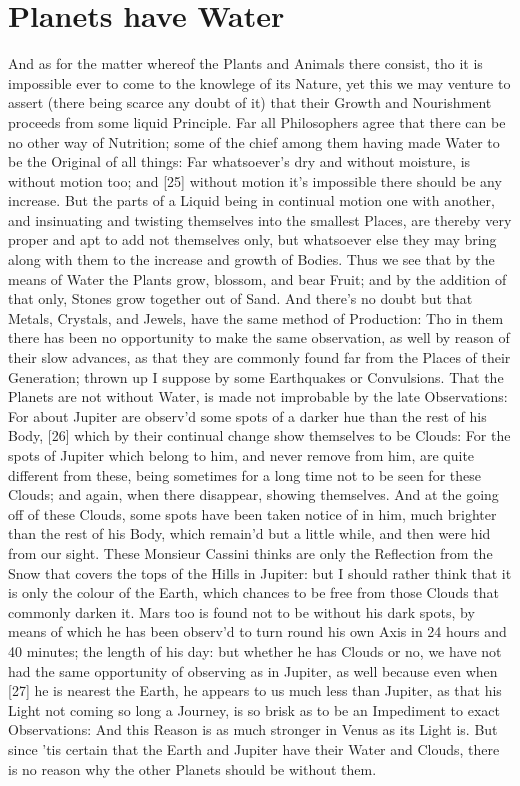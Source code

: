 \documentclass[letterpaper]{book}
\begin{document}
\section{Planets have Water}

And as for the matter whereof the Plants and Animals there consist, tho it
is impossible ever to come to the knowlege of its Nature, yet this we may
venture to assert (there being scarce any doubt of it) that their Growth and
Nourishment proceeds from some liquid Principle. Far all Philosophers agree
that there can be no other way of Nutrition; some of the chief among them
having made Water to be the Original of all things: Far whatsoever's dry and
without moisture, is without motion too; and [25] without motion it's
impossible there should be any increase. But the parts of a Liquid being in
continual motion one with another, and insinuating and twisting themselves
into the smallest Places, are thereby very proper and apt to add not
themselves only, but whatsoever else they may bring along with them to the
increase and growth of Bodies. Thus we see that by the means of Water the
Plants grow, blossom, and bear Fruit; and by the addition of that only,
Stones grow together out of Sand. And there's no doubt but that Metals,
Crystals, and Jewels, have the same method of Production: Tho in them there
has been no opportunity to make the same observation, as well by reason of
their slow advances, as that they are commonly found far from the Places of
their Generation; thrown up I suppose by some Earthquakes or Convulsions.
That the Planets are not without Water, is made not improbable by the late
Observations: For about Jupiter are observ'd some spots of a darker hue than
the rest of his Body, [26] which by their continual change show themselves
to be Clouds: For the spots of Jupiter which belong to him, and never remove
from him, are quite different from these, being sometimes for a long time
not to be seen for these Clouds; and again, when there disappear, showing
themselves. And at the going off of these Clouds, some spots have been taken
notice of in him, much brighter than the rest of his Body, which remain'd
but a little while, and then were hid from our sight. These Monsieur Cassini
thinks are only the Reflection from the Snow that covers the tops of the
Hills in Jupiter: but I should rather think that it is only the colour of
the Earth, which chances to be free from those Clouds that commonly darken
it.  Mars too is found not to be without his dark spots, by means of which
he has been observ'd to turn round his own Axis in 24 hours and 40 minutes;
the length of his day: but whether he has Clouds or no, we have not had the
same opportunity of observing as in Jupiter, as well because even when [27]
he is nearest the Earth, he appears to us much less than Jupiter, as that
his Light not coming so long a Journey, is so brisk as to be an Impediment
to exact Observations: And this Reason is as much stronger in Venus as its
Light is. But since 'tis certain that the Earth and Jupiter have their Water
and Clouds, there is no reason why the other Planets should be without them.
\end{document}
